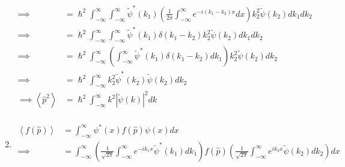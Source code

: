 \documentclass[addpoints]{exam}
\begin{document}
\begin{questions}
\begin{solution}
\begin{enumerate}
\begin{equation*}
\begin{aligned}
                          \implies                        & = \hslash^2\int_{-\infty}^{\infty} \int_{-\infty}^{\infty}\tilde{\psi}^*(k_1)\left(\frac{1}{2\pi}\int_{-\infty}^{\infty}e^{-i(k_1-k_2)x}dx\right)k_2^2 \tilde{\psi}(k_2) dk_1dk_2                                                       \\
                          \implies                        & = \hslash^2\int_{-\infty}^{\infty} \int_{-\infty}^{\infty}\tilde{\psi}^*(k_1)\delta(k_1-k_2)k_2^2 \tilde{\psi}(k_2) dk_1dk_2                                                                                                            \\
                          \implies                        & = \hslash^2\int_{-\infty}^{\infty} \left(\int_{-\infty}^{\infty}\tilde{\psi}^*(k_1)\delta(k_1-k_2)dk_1\right)k_2^2 \tilde{\psi}(k_2) dk_2                                                                                               \\
                          \implies                        & = \hslash^2\int_{-\infty}^{\infty} k_2^2 \tilde{\psi}^*(k_2) \tilde{\psi}(k_2) dk_2                                                                                                                                                     \\
                          \implies \left<\hat{p}^2\right> & = \hslash^2\int_{-\infty}^{\infty} k^2 \left|\tilde{\psi}(k)\right|^2 dk                                                                                                                                                                \\
                      \end{aligned}
                  \end{equation*}
            \item \begin{equation*}
                      \begin{aligned}
                          \left<f(\hat{p})\right>          & = \int_{-\infty}^{\infty} \psi^*(x)f(\hat{p})\psi(x) dx                                                                                                                                                                                                                    \\
                          \implies                         & = \int_{-\infty}^{\infty} \left(\frac{1}{\sqrt{2\pi}}\int_{-\infty}^{\infty}e^{-ik_1x}\tilde{\psi}^*(k_1)dk_1\right)f(\hat{p})\left(\frac{1}{\sqrt{2\pi}}\int_{-\infty}^{\infty}e^{ik_2x}\tilde{\psi}(k_2)dk_2\right) dx                                                   \\

\end{aligned}
\end{equation*}
\end{enumerate}
\end{solution}
\end{questions}
\end{document}
